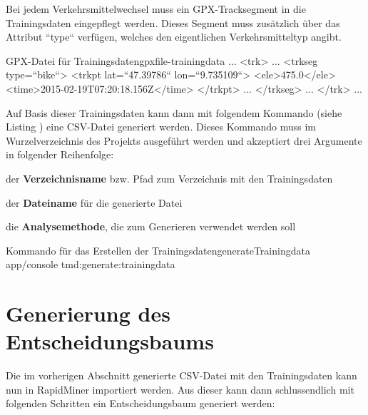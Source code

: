 Bei jedem Verkehrsmittelwechsel muss ein GPX-Tracksegment in die Trainingsdaten eingepflegt werden. Dieses Segment muss zusätzlich über das Attribut ``type`` verfügen, welches den eigentlichen Verkehrsmitteltyp angibt.

\begin{code}[xml]{GPX-Datei für Trainingsdaten}{gpxfile-trainingdata}
...
    <trk>
        ...
        <trkseg type=``bike``>
            <trkpt lat=``47.39786`` lon=``9.735109``>
                <ele>475.0</ele>
                <time>2015-02-19T07:20:18.156Z</time>
            </trkpt>
            ...
        </trkseg>
        ...
    </trk>
...
\end{code}

Auf Basis dieser Trainingsdaten kann dann mit folgendem Kommando (siehe Listing ) eine CSV-Datei generiert werden. Dieses Kommando muss im Wurzelverzeichnis des Projekts ausgeführt werden und akzeptiert drei Argumente in folgender Reihenfolge:

\begin{pitemize}
\item der \textbf{Verzeichnisname} bzw. Pfad zum Verzeichnis mit den Trainingsdaten
\item der \textbf{Dateiname} für die generierte Datei
\item die \textbf{Analysemethode}, die zum Generieren verwendet werden soll
\end{pitemize}

\begin{code}[xml]{Kommando für das Erstellen der Trainingsdaten}{generateTrainingdata}
app/console tmd:generate:trainingdata
\end{code}

\section*{Generierung des Entscheidungsbaums}
Die im vorherigen Abschnitt generierte CSV-Datei mit den Trainingsdaten kann nun in RapidMiner importiert werden. Aus dieser kann dann schlussendlich mit folgenden Schritten ein Entscheidungsbaum generiert werden: 

